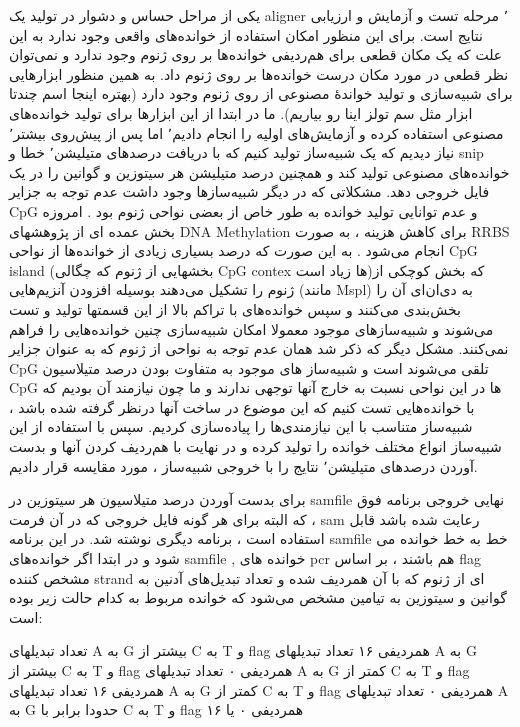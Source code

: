 
یکی از مراحل حساس و دشوار در تولید یک aligner ٬ مرحله تست و آزمایش و ارزیابی نتایج است. برای این منظور امکان استفاده از خوانده‌های واقعی وجود ندارد به این علت که یک مکان قطعی برای هم‌ردیفی خوانده‌ها بر روی ژنوم وجود ندارد و نمی‌توان نظر قطعی در مورد مکان درست خوانده‌ها بر روی ژنوم داد. به همین منظور ابزارهایی برای شبیه‌سازی و تولید خواندهٔ مصنوعی از روی ژنوم وجود دارد (بهتره اینجا اسم چندتا ابزار مثل سم تولز اینا رو بیاریم).
 ما در ابتدا از این ابزارها برای تولید خوانده‌های مصنوعی استفاده کرده و آزمایش‌های اولیه را انجام دادیم٬ اما پس از پیش‌روی بیشتر٬ نیاز دیدیم که یک شبیه‌ساز تولید کنیم که با دریافت درصدهای متیلیشن٬ خطا و snip خوانده‌های مصنوعی تولید کند و همچنین درصد متیلیشن هر سیتوزین و گوانین را در یک فایل خروجی دهد. مشکلاتی که در دیگر شبیه‌سازها وجود داشت عدم توجه به جزایر CpG و عدم توانایی تولید خوانده‌ به طور خاص از بعضی نواحی ژنوم  بود . امروزه  بخش عمده ای از پژوهشهای DNA Methylation برای کاهش هزینه ، به صورت RRBS انجام می‌شود . به این صورت که درصد بسیاری زیادی از خوانده‌ها از نواحی CpG island (بخشهایی از ژنوم که چگالی CpG contex ها زیاد است)که بخش کوچکی از ژنوم را تشکیل می‌دهند بوسیله افزودن آنزیم‌هایی (مانند Mspl) به دی‌ان‌ای آن را بخش‌بندی می‌کنند و سپس خوانده‌های با تراکم بالا از این قسمتها تولید و تست می‌شوند و شبیه‌سازهای موجود معمولا امکان شبیه‌سازی چنین خوانده‌هایی را فراهم نمی‌کنند.
مشکل دیگر که ذکر شد همان عدم توجه به نواحی از ژنوم که به عنوان جزایر CpG  تلقی می‌شوند است و شبیه‌ساز های موجود به متفاوت بودن درصد متیلاسیون CpG ها در این نواحی نسبت به خارج آنها توجهی ندارند و ما چون نیازمند آن بودیم که با خوانده‌هایی تست کنیم که این موضوع در ساخت آنها درنظر گرفته شده باشد ، شبیه‌ساز متناسب با این نیازمندی‌ها را پیاده‌سازی کردیم.
سپس با استفاده از این شبیه‌ساز انواع مختلف خوانده را تولید کرده و در نهایت با هم‌ردیف کردن آنها و بدست آوردن درصدهای متیلیشن٬ نتایج را با خروجی شبیه‌ساز ، مورد مقایسه قرار دادیم.


برای بدست آوردن درصد متیلاسیون هر سیتوزین در samfile نهایی خروجی برنامه فوق ، که البته برای هر گونه فایل خروجی که در آن فرمت sam رعایت شده باشد قابل استفاده است ، برنامه دیگری نوشته شد.
در این برنامه samfile خط به خط خوانده می شود و در ابتدا اگر خوانده‌های samfile , خوانده های pcr هم باشند ، بر اساس flag مشخص کننده strand ای از ژنوم که با آن همردیف شده و تعداد تبدیل‌های آدنین به گوانین و سیتوزین به تیامین مشخص می‌شود که خوانده مربوط به کدام حالت زیر بوده است:

 تعداد تبدیلهای A به G بیشتر از C به T و flag همردیفی ۱۶
 تعداد تبدیلهای A به G بیشتر از C به T و flag همردیفی ۰
 تعداد تبدیلهای A به G کمتر از C به T و flag همردیفی ۱۶
 تعداد تبدیلهای A به G کمتر از C به T و flag همردیفی ۰
 تعداد تبدیلهای A به G حدودا برابر با  C به T و flag همردیفی ۰ یا ۱۶

